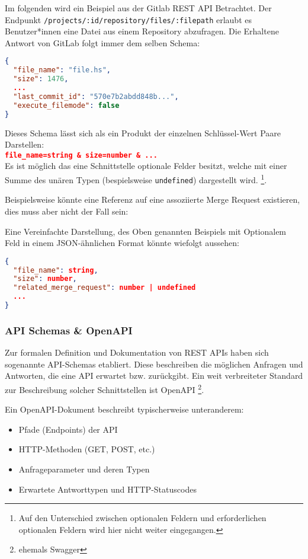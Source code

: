 Im folgenden wird ein Beispiel aus der Gitlab REST API Betrachtet. Der Endpunkt \texttt{/projects/:id/repository/files/:filepath} erlaubt es
Benutzer*innen eine Datei aus einem Repository abzufragen. Die Erhaltene Antwort von GitLab folgt immer dem selben Schema:
\begin{lstlisting}[language=json]
{
  "file_name": "file.hs",
  "size": 1476,
  ...
  "last_commit_id": "570e7b2abdd848b...",
  "execute_filemode": false
}
\end{lstlisting}

Dieses Schema lässt sich als ein Produkt der einzelnen Schlüssel-Wert Paare Darstellen: \\
\lstinline[language=json]|file_name=string & size=number & ...|\\

Es ist möglich das eine Schnittstelle optionale Felder besitzt, welche mit einer Summe 
des unären Typen (bespielsweise \texttt{undefined}) dargestellt wird.
\footnote{Auf den Unterschied zwischen optionalen Feldern und erforderlichen optionalen Feldern wird hier nicht weiter eingegangen.}.

Beispielsweise könnte eine Referenz auf eine assoziierte Merge Request existieren, dies muss aber nicht der Fall sein:

Eine Vereinfachte Darstellung, des Oben genannten Beispiels mit Optionalem Feld 
in einem JSON-ähnlichen Format könnte wiefolgt aussehen:

\begin{lstlisting}[language=json]
{
  "file_name": string,
  "size": number,
  "related_merge_request": number | undefined
  ...
}
\end{lstlisting}

\subsubsection{API Schemas \& OpenAPI}

Zur formalen Definition und Dokumentation von REST APIs haben sich sogenannte API-Schemas etabliert.
Diese beschreiben die möglichen Anfragen und Antworten, die eine API erwartet bzw. zurückgibt.
Ein weit verbreiteter Standard zur Beschreibung solcher Schnittstellen ist OpenAPI \footnote{ehemals Swagger}.

Ein OpenAPI-Dokument beschreibt typischerweise unteranderem:
\begin{itemize}
    \item Pfade (Endpoints) der API
    \item HTTP-Methoden (GET, POST, etc.)
    \item Anfrageparameter und deren Typen
    \item Erwartete Antworttypen und HTTP-Statuscodes
\end{itemize}

